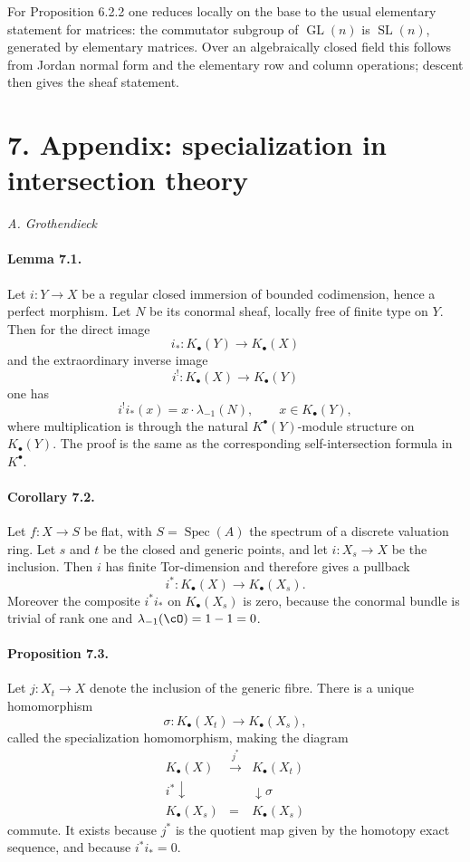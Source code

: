\documentclass[11pt]{article}
\theoremstyle{plain}
\theoremstyle{definition}
\theoremstyle{remark}
\DeclareMathOperator{\Spec}{Spec}
\newcommand{\longto}{\longrightarrow}
\providecommand{\xto}[1]{\xrightarrow{#1}}
\providecommand{\Gl}{\operatorname{GL}}
\providecommand{\Sl}{\operatorname{SL}}
\begin{document}
For Proposition 6.2.2 one reduces locally on the base to the usual elementary statement for matrices: the commutator subgroup of $\Gl(n)$ is $\Sl(n)$, generated by elementary matrices. Over an algebraically closed field this follows from Jordan normal form and the elementary row and column operations; descent then gives the sheaf statement.

\section*{7. Appendix: specialization in intersection theory}

\begin{flushright}
\emph{A. Grothendieck}
\end{flushright}

\paragraph{Lemma 7.1.}
Let $i:Y\to X$ be a regular closed immersion of bounded codimension, hence a perfect morphism. Let $N$ be its conormal sheaf, locally free of finite type on $Y$. Then for the direct image
\[
i_*:K_\bullet(Y)\longto K_\bullet(X)
\]
and the extraordinary inverse image
\[
i^!:K_\bullet(X)\longto K_\bullet(Y)
\]
one has
\[
i^!i_*(x)=x\cdot \lambda_{-1}(N),\qquad x\in K_\bullet(Y),
\]
where multiplication is through the natural $K^\bullet(Y)$-module structure on $K_\bullet(Y)$. The proof is the same as the corresponding self-intersection formula in $K^\bullet$.

\paragraph{Corollary 7.2.}
Let $f:X\to S$ be flat, with $S=\Spec(A)$ the spectrum of a discrete valuation ring. Let $s$ and $t$ be the closed and generic points, and let $i:X_s\to X$ be the inclusion. Then $i$ has finite Tor-dimension and therefore gives a pullback
\[
i^*:K_\bullet(X)\longto K_\bullet(X_s).
\]
Moreover the composite $i^*i_*$ on $K_\bullet(X_s)$ is zero, because the conormal bundle is trivial of rank one and $\lambda_{-1}(\cO)=1-1=0$.

\paragraph{Proposition 7.3.}
Let $j:X_t\to X$ denote the inclusion of the generic fibre. There is a unique homomorphism
\[
\sigma:K_\bullet(X_t)\longto K_\bullet(X_s),
\]
called the specialization homomorphism, making the diagram
\[
\begin{array}{ccc}
K_\bullet(X)&\xto{\,j^*\,}&K_\bullet(X_t)\\
\scriptstyle i^*\downarrow&&\downarrow\scriptstyle \sigma\\
K_\bullet(X_s)&=&K_\bullet(X_s)
\end{array}
\]
commute. It exists because $j^*$ is the quotient map given by the homotopy exact sequence, and because $i^*i_*=0$.
\end{document}
